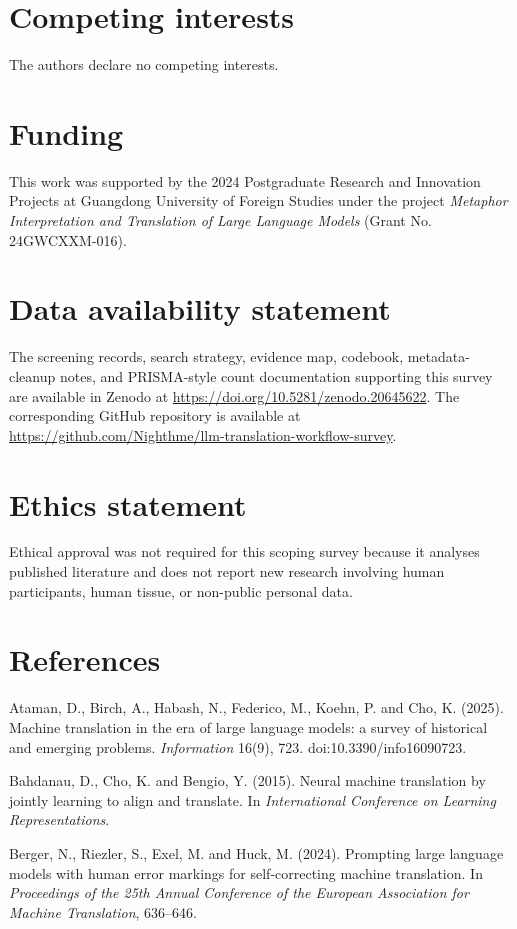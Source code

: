 \documentclass[11pt]{article}
\begin{document}
\section*{Competing interests}
The authors declare no competing interests.

\section*{Funding}
This work was supported by the 2024 Postgraduate Research and Innovation Projects at Guangdong University of Foreign Studies under the project \emph{Metaphor Interpretation and Translation of Large Language Models} (Grant No. 24GWCXXM-016).

\section*{Data availability statement}
The screening records, search strategy, evidence map, codebook, metadata-cleanup notes, and PRISMA-style count documentation supporting this survey are available in Zenodo at \url{https://doi.org/10.5281/zenodo.20645622}. The corresponding GitHub repository is available at \url{https://github.com/Nighthme/llm-translation-workflow-survey}.

\section*{Ethics statement}
Ethical approval was not required for this scoping survey because it analyses published literature and does not report new research involving human participants, human tissue, or non-public personal data.

\section*{References}
\footnotesize
\RaggedRight
Ataman, D., Birch, A., Habash, N., Federico, M., Koehn, P. and Cho, K. (2025). Machine translation in the era of large language models: a survey of historical and emerging problems. \emph{Information} 16(9), 723. doi:10.3390/info16090723.

Bahdanau, D., Cho, K. and Bengio, Y. (2015). Neural machine translation by jointly learning to align and translate. In \emph{International Conference on Learning Representations}.

Berger, N., Riezler, S., Exel, M. and Huck, M. (2024). Prompting large language models with human error markings for self-correcting machine translation. In \emph{Proceedings of the 25th Annual Conference of the European Association for Machine Translation}, 636--646.
\end{document}
